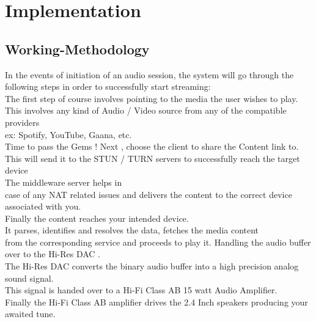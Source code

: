 \chapter{Implementation}

\section{Working-Methodology}

In the events of initiation of an audio session, the system will go through the\\
following steps in order to successfully start streaming:\\

 The first step of course involves pointing to the media the user wishes to play.\\
 This involves any kind of Audio / Video source from any of the compatible providers \\
 ex: Spotify, YouTube, Gaana, etc.\\
 
 Time to pass the Gems ! Next , choose the client to share the Content link to.\\
  This will send it to the STUN / TURN servers to successfully reach the target device\\

 The  middleware server helps in\\
 case of any NAT related issues and delivers the content to the correct device associated with you.\\

Finally the content reaches your intended device.\\
It parses, identifies and resolves the data, fetches the media content \\
from the corresponding service and proceeds to play it. Handling the audio buffer over to the Hi-Res DAC .\\

The Hi-Res DAC converts the binary audio buffer into a high precision analog sound signal.\\
 This signal is handed over to a Hi-Fi Class AB 15 watt Audio Amplifier.\\

Finally the Hi-Fi Class AB amplifier drives the 2.4 Inch speakers producing your awaited tune.\\


